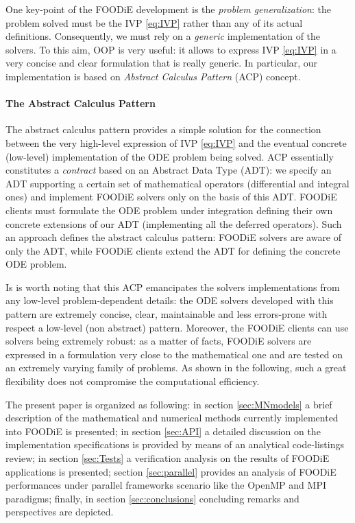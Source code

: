\documentclass[pdftex,preprint,3p,times,numbers]{elsarticle}
\begin{document}
One key-point of the FOODiE development is the \emph{problem generalization}: the problem solved must be the IVP \ref{eq:IVP} rather than any of its actual definitions. Consequently, we must rely on a \emph{generic} implementation of the solvers. To this aim, OOP is very useful: it allows to express IVP \ref{eq:IVP} in a very concise and clear formulation that is really generic. In particular, our implementation is based on \emph{Abstract Calculus Pattern} (ACP) concept.

\paragraph{The Abstract Calculus Pattern}
The abstract calculus pattern provides a simple solution for the connection between the very high-level expression of IVP \ref{eq:IVP} and the eventual concrete (low-level) implementation of the ODE problem being solved. ACP essentially constitutes a \emph{contract} based on an Abstract Data Type (ADT): we specify an ADT supporting a certain set of mathematical operators (differential and integral ones) and implement FOODiE solvers only on the basis of this ADT. FOODiE clients must formulate the ODE problem under integration defining their own concrete extensions of our ADT (implementing all the deferred operators). Such an approach defines the abstract calculus pattern: FOODiE solvers are aware of only the ADT, while FOODiE clients extend the ADT for defining the concrete ODE problem.

Is is worth noting that this ACP emancipates the solvers implementations from any low-level problem-dependent details: the ODE solvers developed with this pattern are extremely concise, clear, maintainable and less errors-prone with respect a low-level (non abstract) pattern. Moreover, the FOODiE clients can use solvers being extremely robust: as a matter of facts, FOODiE solvers are expressed in a formulation very close to the mathematical one and are tested on an extremely varying family of problems. As shown in the following, such a great flexibility does not compromise the computational efficiency.

The present paper is organized as following: in section \ref{sec:MNmodels} a brief description of the mathematical and numerical methods currently implemented into FOODiE is presented; in section \ref{sec:API} a detailed discussion on the implementation specifications is provided by means of an analytical code-listings review; in section \ref{sec:Tests} a verification analysis on the results of FOODiE applications is presented; section \ref{sec:parallel} provides an analysis of FOODiE performances under parallel frameworks scenario like the OpenMP and MPI paradigms; finally, in section \ref{sec:conclusions} concluding remarks and perspectives are depicted.
\end{document}

